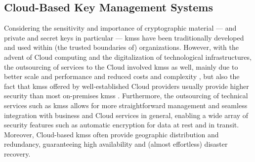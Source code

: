 \subsection{Cloud-Based Key Management Systems}\label{sec:key_management:cloud}




Considering the sensitivity and importance of cryptographic material --- and private and secret keys in particular --- \glspl{kms} have been traditionally developed and used within (the trusted boundaries of) organizations. However, with the advent of Cloud computing and the digitalization of technological infrastructures, the outsourcing of services to the Cloud involved \glspl{kms} as well, mainly due to better scale and performance and reduced costs and complexity \cite{csa_key_2020}, but also the fact that \glspl{kms} offered by well-established Cloud providers usually provide higher security than most on-premises \glspl{kms} \cite{csa_recommendations_2021}. Furthermore, the outsourcing of technical services such as \glspl{kms} allows for more straightforward management and seamless integration with business and Cloud services in general, enabling a wide array of security features such as automatic encryption for data at rest and in transit. Moreover, Cloud-based \glspl{kms} often provide geographic distribution and redundancy, guaranteeing high availability and (almost effortless) disaster recovery.


